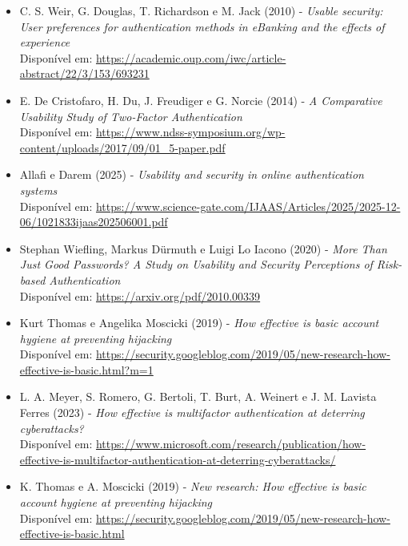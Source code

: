 \begin{itemize}
    \item C. S. Weir, G. Douglas, T. Richardson e M. Jack (2010) -
    \textit{Usable security: User preferences for authentication methods in eBanking and the effects of experience}\\[0.01cm]
    Disponível em: \url{https://academic.oup.com/iwc/article-abstract/22/3/153/693231}

    \item E. De Cristofaro, H. Du, J. Freudiger e G. Norcie (2014) -
    \textit{A Comparative Usability Study of Two-Factor Authentication}\\[0.01cm]
    Disponível em: \url{https://www.ndss-symposium.org/wp-content/uploads/2017/09/01_5-paper.pdf}

    \item Allafi e Darem (2025) -
    \textit{Usability and security in online authentication systems}\\[0.01cm]
    Disponível em: \url{https://www.science-gate.com/IJAAS/Articles/2025/2025-12-06/1021833ijaas202506001.pdf}

    \item Stephan Wiefling, Markus Dürmuth e Luigi Lo Iacono (2020) -
    \textit{More Than Just Good Passwords? A Study on Usability and Security Perceptions of Risk-based Authentication}\\[0.01cm]
    Disponível em: \url{https://arxiv.org/pdf/2010.00339}

    \item Kurt Thomas e Angelika Moscicki (2019) -
    \textit{How effective is basic account hygiene at preventing hijacking}\\[0.01cm]
    Disponível em: \url{https://security.googleblog.com/2019/05/new-research-how-effective-is-basic.html?m=1}

    \item L. A. Meyer, S. Romero, G. Bertoli, T. Burt, A. Weinert e J. M. Lavista Ferres (2023) -
    \textit{How effective is multifactor authentication at deterring cyberattacks?}\\[0.01cm]
    Disponível em: \url{https://www.microsoft.com/research/publication/how-effective-is-multifactor-authentication-at-deterring-cyberattacks/}

    \item K. Thomas e A. Moscicki (2019) -
    \textit{New research: How effective is basic account hygiene at preventing hijacking}\\[0.01cm]
    Disponível em: \url{https://security.googleblog.com/2019/05/new-research-how-effective-is-basic.html}


\end{itemize}
